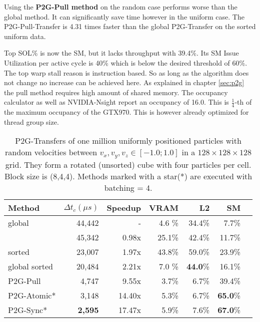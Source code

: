 \documentclass[m,times]{cgMA}
\begin{document}
Using the \textbf{P2G-Pull method} on the random case performs worse than the global method. It can significantly save time however in the uniform case. The P2G-Pull-Transfer is 4.31 times faster than the global P2G-Transfer on the sorted uniform data.

Top SOL\% is now the SM, but it lacks throughput with 39.4\%. Its SM Issue Utilization per active cycle is 40\% which is below the desired threshold of 60\%. The top warp stall reason is instruction based. So as long as the algorithm does not change no increase can be achieved here. As explained in chapter \ref{sec:p2g} the pull method requires high amount of shared memory. The occupancy calculator as well as NVIDIA-Nsight report an occupancy of 16.0. This is $\frac{1}{4}$-th of the maximum occupancy of the GTX970. This is however already optimized for thread group size.

\begin{table}[htpb]
  \begin{tabular}{ | l | r | r | r | r | r | r |}    \hline
    Method                 &  $\Delta t_c(\mu s)$ &Speedup         &VRAM  & L2   &SM     \\\hline
    global                 &   44,442             &-               &4.6 \%&34.4\%&7.7\%  \\\hline
    \cite{Meyer2015}       &   45,342             &0.98x           &25.1\%&42.4\%&11.7\% \\\hline
    \cite{Meyer2015} sorted&   23,007		  &1.97x           &43.8\%&59.0\%&23.9\% \\\hline
    global sorted          &   20,484		  &2.21x           &7.0 \%&\textbf{44.0}\%&16.1\% \\\hline
    \hline
    P2G-Pull               &    4,747             &9.55x           &3.7\% &6.7\% &39.4\%\\\hline
    P2G-Atomic*		   &    3,148             &14.40x          &5.3\% &6.7\% &\textbf{65.0}\%\\\hline
    P2G-Sync*              &    \textbf{2,595}    &17.47x          &5.9\%&7.6\%  &\textbf{67.0}\%\\\hline
 \end{tabular}
 \caption{P2G-Transfers of one million uniformly positioned particles with random velocities between $v_x,v_y,v_z \in [-1.0;1.0]$ in a $128\times 128\times128$ grid. They form a rotated (unsorted) cube with four particles per cell. Block size is (8,4,4). Methods marked with a star(*) are executed with batching = 4.}\label{table:p2g_uniform4}
\end{table}
\end{document}
